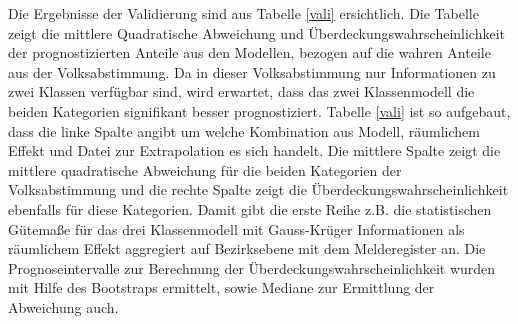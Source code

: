 \documentclass{Vorlage}
\begin{document}
Die Ergebnisse der Validierung sind aus Tabelle \ref{vali} ersichtlich. Die Tabelle zeigt die mittlere Quadratische Abweichung und Überdeckungswahrscheinlichkeit der prognostizierten Anteile aus den Modellen, bezogen auf die wahren Anteile aus der Volksabstimmung. Da in dieser Volksabstimmung nur Informationen zu zwei Klassen verfügbar sind, wird erwartet, dass das zwei Klassenmodell die beiden Kategorien signifikant besser prognostiziert.
Tabelle \ref{vali} ist so aufgebaut, dass die linke Spalte angibt um welche Kombination aus Modell, räumlichem Effekt und Datei zur Extrapolation es sich handelt. Die mittlere Spalte zeigt die mittlere quadratische Abweichung für die beiden Kategorien der Volksabstimmung und die rechte Spalte zeigt die Überdeckungswahrscheinlichkeit ebenfalls für diese Kategorien. Damit gibt die erste Reihe z.B. die statistischen Gütemaße für das drei Klassenmodell mit Gauss-Krüger Informationen als räumlichem Effekt aggregiert auf Bezirksebene mit dem Melderegister an. Die Prognoseintervalle zur Berechnung der Überdeckungswahrscheinlichkeit wurden mit Hilfe des Bootstraps ermittelt, sowie Mediane zur Ermittlung der Abweichung auch.
\end{document}
